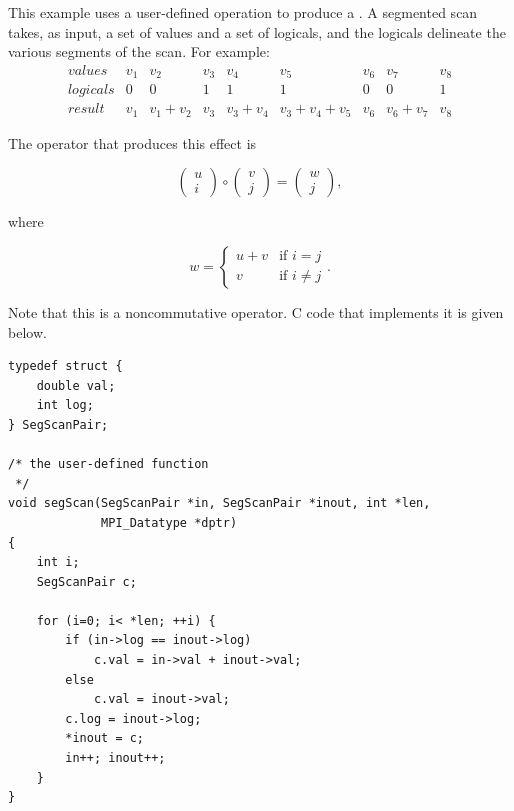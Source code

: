 \begin{example}
\label{coll-exW}
%
This example uses a user-defined operation to produce a .
A segmented scan takes, as input, a set of values and a set of logicals,
and the logicals delineate the various segments of the scan.
For example:
$$
\begin{array}{lcccccccc}
values & v_1 & v_2 & v_3 & v_4 & v_5 & v_6 & v_7 & v_8 \\
logicals & 0 & 0   & 1   & 1   & 1   & 0   & 0   & 1   \\
result & v_1 & v_1 + v_2 & v_3 & v_3 + v_4 & v_3 + v_4 + v_5 & v_6 & v_6 + v_7 & v_8
\end{array}
$$

The operator that produces this effect is

$$
\left( \begin{array}{c} u \\ i \end{array} \right)
\circ
\left( \begin{array}{c} v \\ j \end{array} \right)
=
\left( \begin{array}{c} w \\ j \end{array} \right) ,
$$

where

$$
w = \left\{ \begin{array}{ll}
    u+v & \mbox{if $i = j$} \\
    v & \mbox{if $i \neq j$}
    \end{array}
    \right.
.
$$

Note that this is a noncommutative operator.
C code that implements it is given below.

\begin{lstlisting}[language={[MPI]C}]
typedef struct {
    double val;
    int log;
} SegScanPair;

/* the user-defined function
 */
void segScan(SegScanPair *in, SegScanPair *inout, int *len,
             MPI_Datatype *dptr)
{
    int i;
    SegScanPair c;

    for (i=0; i< *len; ++i) {
        if (in->log == inout->log)
            c.val = in->val + inout->val;
        else
            c.val = inout->val;
        c.log = inout->log;
        *inout = c;
        in++; inout++;
    }
}
\end{lstlisting}


\end{example}

